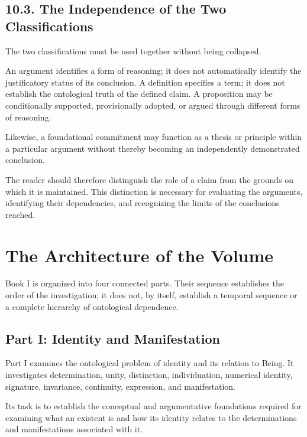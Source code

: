 \subsection*{10.3. The Independence of the Two Classifications}

The two classifications must be used
together without being collapsed.

An argument identifies a form of reasoning;
it does not automatically identify the
justificatory status of its conclusion.
A definition specifies a term; it does
not establish the ontological truth of
the defined claim. A proposition may
be conditionally supported, provisionally
adopted, or argued through different
forms of reasoning.

Likewise, a foundational commitment
may function as a thesis or principle
within a particular argument without
thereby becoming an independently
demonstrated conclusion.

The reader should therefore distinguish
the role of a claim from the grounds
on which it is maintained. This
distinction is necessary for evaluating
the arguments, identifying their
dependencies, and recognizing the
limits of the conclusions reached.



\section*{The Architecture of the Volume}

Book I is organized into four connected
parts. Their sequence establishes the
order of the investigation; it does not,
by itself, establish a temporal sequence
or a complete hierarchy of ontological
dependence.

\subsection*{Part I: Identity and Manifestation}

Part I examines the ontological problem
of identity and its relation to Being.
It investigates determination, unity,
distinction, individuation, numerical
identity, signature, invariance,
continuity, expression, and manifestation.

Its task is to establish the conceptual
and argumentative foundations required
for examining what an existent is and
how its identity relates to the
determinations and manifestations
associated with it.

